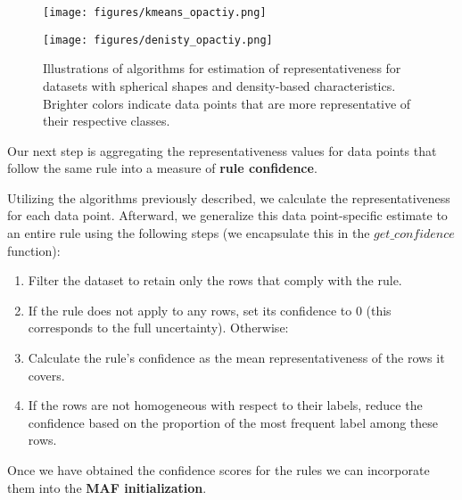 \documentclass[10pt,a4paper,oneside]{article}
\begin{document}
\begin{figure}[H]
    \centering
    \begin{minipage}{0.49\textwidth}
        \texttt{[image: figures/kmeans\_opactiy.png]} %
    \end{minipage}\hfill
    \begin{minipage}{0.49\textwidth}
        \texttt{[image: figures/denisty\_opactiy.png]} %
    \end{minipage}
    \caption{Illustrations of algorithms for estimation of representativeness for datasets with spherical shapes and density-based characteristics. Brighter colors indicate data points that are more representative of their respective classes.}
    \label{fig:reprs}
\end{figure}

Our next step is aggregating the representativeness values for data points that follow the same rule into a measure of \textbf{rule confidence}.

Utilizing the algorithms previously described, we calculate the representativeness for each data point. Afterward, we generalize this data point-specific estimate to an entire rule using the following steps (we encapsulate this in the $get\_confidence$ function):
\begin{enumerate}
    \item Filter the dataset to retain only the rows that comply with the rule.
    \item If the rule does not apply to any rows, set its confidence to 0 (this corresponds to the full uncertainty). Otherwise:
    \item Calculate the rule's confidence as the mean representativeness of the rows it covers.
    \item If the rows are not homogeneous with respect to their labels, reduce the confidence based on the proportion of the most frequent label among these rows.
\end{enumerate}

Once we have obtained the confidence scores for the rules we can incorporate them into the \textbf{MAF initialization}.
\end{document}
